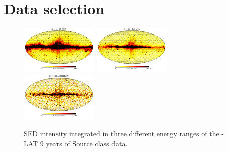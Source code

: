 \section{Data selection}


\begin{figure}[h]
\includegraphics[width=0.33\textwidth]{plots/Mollweide_data_source_range_0.pdf}
\includegraphics[width=0.33\textwidth]{plots/Mollweide_data_source_range_1.pdf}
\includegraphics[width=0.33\textwidth]{plots/Mollweide_data_source_range_2.pdf}
\caption{SED intensity integrated in three different energy ranges of the \Fermi-LAT 9 years of Source class data.
}
\label{fig:Maps_data}
\end{figure}

